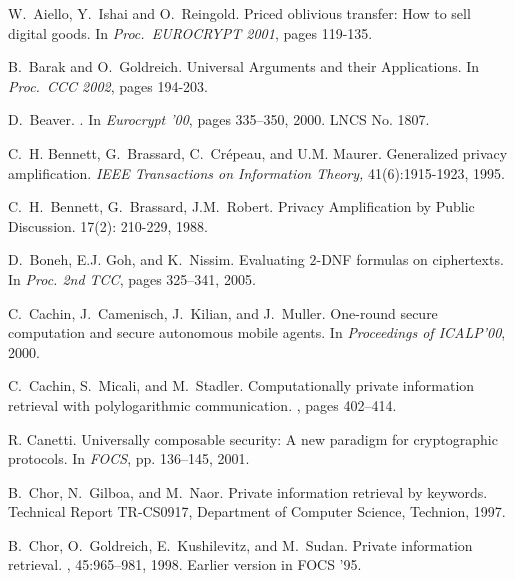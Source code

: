 \documentclass{article}
\begin{document}
\begin{footnotesize}
	\begin{thebibliography}{10}
		
		W.~Aiello, Y.~Ishai and O.~Reingold.
		\newblock Priced oblivious transfer: How to sell digital goods.
		\newblock In {\em Proc.\ EUROCRYPT 2001}, pages 119-135.
		
		B.~Barak and O.~Goldreich.
		\newblock  Universal Arguments and their
		Applications.
		\newblock In {\em Proc.\ CCC 2002}, pages 194-203.
		
		D.~Beaver.
		.
		\newblock In {\em Eurocrypt '00}, pages 335--350, 2000.
		\newblock LNCS No. 1807.
		
		 C.~H. Bennett, G.~Brassard, C.~Cr{\'e}peau, and U.M.
		Maurer.
		\newblock Generalized privacy amplification. {\em IEEE Transactions on
			Information Theory,} 41(6):1915-1923, 1995.
		
		 C.~H.~Bennett, G.~Brassard, J.M.~Robert.
		\newblock Privacy Amplification by Public Discussion.
		 17(2): 210-229, 1988.
		
		D.~Boneh, E.J. Goh, and K.~Nissim.
		\newblock Evaluating $2$-{DNF} formulas on ciphertexts.
		\newblock In {\em Proc. 2nd TCC}, pages 325--341, 2005.
		
		 C.~Cachin, J.~Camenisch, J.~Kilian, and J.~Muller.
		\newblock One-round secure computation and secure autonomous mobile
		agents.  
		\newblock In {\em Proceedings of ICALP'00}, 2000.
		
		C.~Cachin, S.~Micali, and M.~Stadler.
		\newblock Computationally private information retrieval with polylogarithmic
		communication.
		, pages 402--414.
		
		 R. Canetti.  \newblock Universally composable
		security: A new paradigm for cryptographic
		protocols. \newblock In {\em FOCS}, pp. 136--145, 2001.
		
		
		B.~Chor, N.~Gilboa, and M.~Naor.
		\newblock Private information retrieval by keywords.
		\newblock Technical Report TR-CS0917, Department of Computer Science, Technion,
		1997.
		
		B.~Chor, O.~Goldreich, E.~Kushilevitz, and M.~Sudan.
		\newblock Private information retrieval.
		, 45:965--981, 1998.
		\newblock Earlier version in FOCS '95.
		

\end{thebibliography}
\end{footnotesize}
\end{document}
